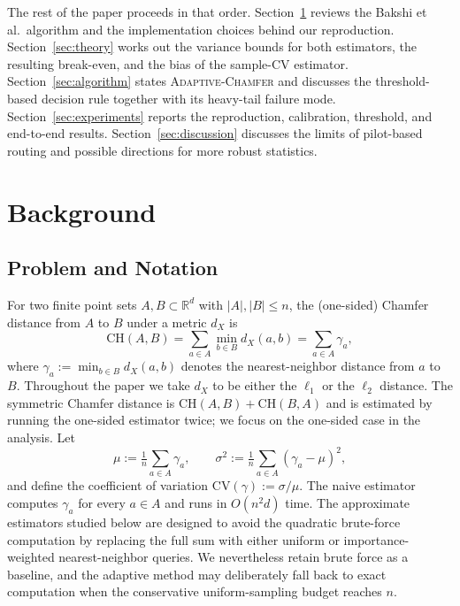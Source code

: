 \documentclass[conference]{IEEEtran}
\begin{document}
The rest of the paper proceeds in that order. Section~\ref{sec:background}
reviews the Bakshi et al.\ algorithm and the implementation choices
behind our reproduction. Section~\ref{sec:theory} works out the
variance bounds for both estimators, the resulting break-even, and the
bias of the sample-CV estimator. Section~\ref{sec:algorithm} states
\textsc{Adaptive-Chamfer} and discusses the threshold-based decision
rule together with its heavy-tail failure mode. Section~\ref{sec:experiments}
reports the reproduction, calibration, threshold, and end-to-end
results. Section~\ref{sec:discussion} discusses the limits of
pilot-based routing and possible directions for more robust statistics.



\section{Background}
\label{sec:background}

\subsection{Problem and Notation}
\label{sec:problem}

For two finite point sets $A, B \subset \mathbb{R}^d$ with
$|A|, |B| \leq n$, the (one-sided) Chamfer distance from $A$ to $B$
under a metric $d_X$ is
\begin{equation}
    \mathrm{CH}(A, B) = \sum_{a \in A} \min_{b \in B} d_X(a, b)
                     = \sum_{a \in A} \gamma_a,
\label{eq:chamfer}
\end{equation}
where $\gamma_a := \min_{b \in B} d_X(a, b)$ denotes the
nearest-neighbor distance from $a$ to $B$. Throughout the paper we
take $d_X$ to be either the $\ell_1$ or the $\ell_2$ distance. The
symmetric Chamfer distance is
$\mathrm{CH}(A, B) + \mathrm{CH}(B, A)$ and is estimated by running
the one-sided estimator twice; we focus on the one-sided case in the
analysis. Let
\begin{equation}
    \mu  := \tfrac{1}{n} \sum_{a \in A} \gamma_a, \qquad
    \sigma^2 := \tfrac{1}{n} \sum_{a \in A} (\gamma_a - \mu)^2,
\label{eq:moments}
\end{equation}
and define the coefficient of variation
$\mathrm{CV}(\gamma) := \sigma / \mu$. The naive estimator computes
$\gamma_a$ for every $a \in A$ and runs in $O(n^2 d)$ time. The
approximate estimators studied below are designed to avoid the
quadratic brute-force computation by replacing the full sum with either
uniform or importance-weighted nearest-neighbor queries. We nevertheless
retain brute force as a baseline, and the adaptive method may
deliberately fall back to exact computation when the conservative
uniform-sampling budget reaches $n$.
\end{document}
